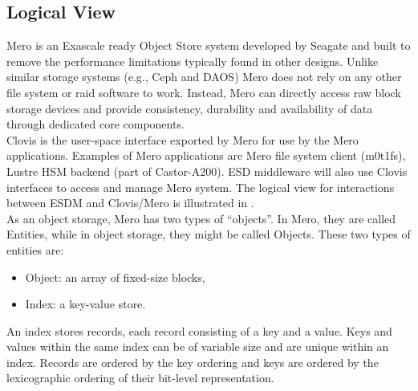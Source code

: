 
\subsection{Logical View}

Mero is an Exascale ready Object Store system developed by Seagate and built to remove the performance limitations typically found in
other designs. Unlike similar storage systems (e.g., Ceph and DAOS) Mero does
not rely on any other file system or raid software to work. Instead, Mero can
directly access raw block storage devices and provide consistency, durability
and availability of data through dedicated core components. \\

Clovis is the user-space interface exported by Mero for use by the Mero
applications.
Examples of Mero applications are Mero file system client (m0t1fs), Lustre HSM backend (part of Castor-A200).
ESD middleware will also use Clovis interfaces to access and manage Mero system.
The logical view for interactions between ESDM and Clovis/Mero is illustrated in .
 \\
As an object storage, Mero has two types of ``objects''. In Mero, they are called
Entities, while in object storage, they might be called Objects. These
two types of entities are: 
\begin{itemize}
\item Object: an array of fixed-size blocks,
\item Index: a key-value store. 
\end{itemize}

An index stores records, each record consisting of a key and a value. Keys and values within the same index can be of variable size and are unique within an index.  Records are ordered by the key ordering and keys are ordered by the lexicographic ordering of their bit-level representation.\\

